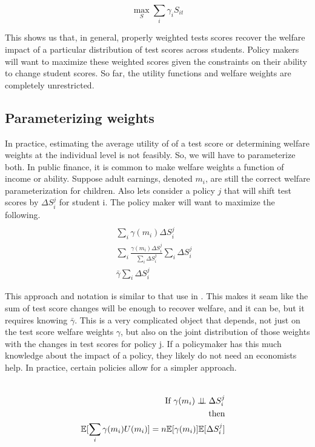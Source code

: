 \documentclass{article}
\theoremstyle{definition}
\theoremstyle{definition}
\theoremstyle{definition}
\begin{document}
\begin{equation}
   \max_S \sum_i \gamma_i S_{it}
\end{equation}

This shows us that, in general, properly weighted tests scores recover the welfare impact of a particular distribution of test scores across students. Policy makers will want to maximize these weighted scores given the constraints on their ability to change student scores. So far, the utility functions and welfare weights are completely unrestricted.

\subsection{Parameterizing weights}

In practice, estimating the average utility of of a test score or determining welfare weights at the individual level is not feasibly. So, we will have to parameterize both. In public finance, it is common to make welfare weights a function of income or ability. Suppose adult earnings, denoted $m_i$, are still the correct welfare parameterization for children. Also lets consider a policy $j$ that will shift test scores by $\Delta S_i^j$ for student i.  The policy maker will want to maximize the following. 
\large
\begin{align*}
   \\ \sum_i \gamma(m_i)\Delta S_i^j &
   \\ \sum_i \frac{\gamma(m_i)\Delta S_i^j}{\sum_i \Delta S_i^j} \sum_i \Delta S_i^j &
   \\ \bar{\gamma} \sum_i \Delta S_i^j &
\end{align*}
  
  \normalsize 

This approach and notation is similar to that use in \cite{Keyser_2020}. This makes it seam like the sum of test score changes will be enough to recover welfare, and it can be, but it requires knowing $\bar{\gamma}$. This is a very complicated object that depends, not just on the test score welfare weights $\gamma$, but also on the joint distribution of those weights with the changes in test scores for policy j. If a policymaker has this much knowledge about the impact of a policy, they likely do not need an economists help. In practice, certain policies allow for a simpler approach. 

\large
\begin{align*}

   \\ \text{If  }   \gamma(m_i) \indep \Delta S_i^j &
    \\ \text{then} &
   \\ \E[\sum_i \gamma(m_i)U(m_i)]= n\E[\gamma(m_i)]\E[\Delta S_i^j] &
\end{align*}
\end{document}
